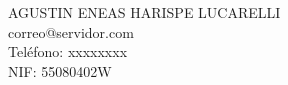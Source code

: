 AGUSTIN ENEAS HARISPE LUCARELLI \\ %
correo@servidor.com \\ %
Teléfono: xxxxxxxx \\ %
NIF: 55080402W \\ %
